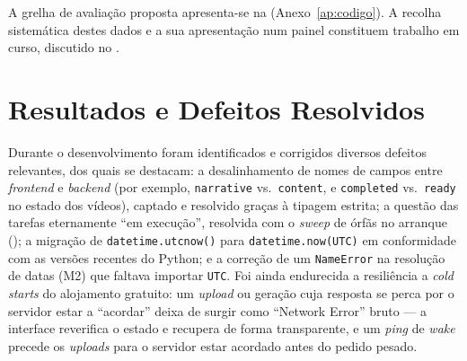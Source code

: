 A grelha de avaliação proposta apresenta-se na 
(Anexo~\ref{ap:codigo}). A recolha sistemática destes dados e a sua
apresentação num painel constituem trabalho em curso, discutido no
.

\section{Resultados e Defeitos Resolvidos}
\label{sec:resultados_testes}

Durante o desenvolvimento foram identificados e corrigidos diversos
defeitos relevantes, dos quais se destacam: a desalinhamento de nomes de
campos entre \emph{frontend} e \emph{backend} (por exemplo,
\texttt{narrative} vs.\ \texttt{content}, e \texttt{completed} vs.\
\texttt{ready} no estado dos vídeos), captado e resolvido graças à tipagem
estrita; a questão das tarefas eternamente ``em execução'', resolvida com
o \emph{sweep} de órfãs no arranque (\Cref{sec:impl_backend}); a migração de
\texttt{datetime.utcnow()} para \texttt{datetime.now(UTC)} em conformidade
com as versões recentes do Python; e a correção de um \texttt{NameError}
na resolução de datas (M2) que faltava importar \texttt{UTC}. Foi ainda
endurecida a resiliência a \emph{cold starts} do alojamento gratuito: um
\emph{upload} ou geração cuja resposta se perca por o servidor estar a
``acordar'' deixa de surgir como ``Network Error'' bruto — a interface
reverifica o estado e recupera de forma transparente, e um \emph{ping} de
\emph{wake} precede os \emph{uploads} para o servidor estar acordado antes
do pedido pesado.

